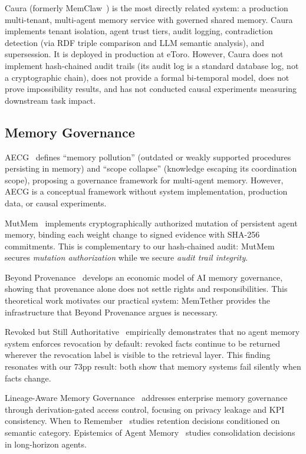 \documentclass[sigconf]{acmart}
\begin{document}
Caura (formerly MemClaw~\cite{caura}) is the most directly related system: a production multi-tenant, multi-agent memory service with governed shared memory. Caura implements tenant isolation, agent trust tiers, audit logging, contradiction detection (via RDF triple comparison and LLM semantic analysis), and supersession. It is deployed in production at eToro. However, Caura does not implement hash-chained audit trails (its audit log is a standard database log, not a cryptographic chain), does not provide a formal bi-temporal model, does not prove impossibility results, and has not conducted causal experiments measuring downstream task impact.

\subsection{Memory Governance}

AECG~\cite{aecg} defines ``memory pollution'' (outdated or weakly supported procedures persisting in memory) and ``scope collapse'' (knowledge escaping its coordination scope), proposing a governance framework for multi-agent memory. However, AECG is a conceptual framework without system implementation, production data, or causal experiments.

MutMem~\cite{mutmem} implements cryptographically authorized mutation of persistent agent memory, binding each weight change to signed evidence with SHA-256 commitments. This is complementary to our hash-chained audit: MutMem secures \emph{mutation authorization} while we secure \emph{audit trail integrity}.

Beyond Provenance~\cite{beyondprovenance} develops an economic model of AI memory governance, showing that provenance alone does not settle rights and responsibilities. This theoretical work motivates our practical system: MemTether provides the infrastructure that Beyond Provenance argues is necessary.

Revoked but Still Authoritative~\cite{revoked} empirically demonstrates that no agent memory system enforces revocation by default: revoked facts continue to be returned wherever the revocation label is visible to the retrieval layer. This finding resonates with our 73pp result: both show that memory systems fail silently when facts change.

Lineage-Aware Memory Governance~\cite{lineage} addresses enterprise memory governance through derivation-gated access control, focusing on privacy leakage and KPI consistency. When to Remember~\cite{whentoremember} studies retention decisions conditioned on semantic category. Epistemics of Agent Memory~\cite{epistemics} studies consolidation decisions in long-horizon agents.
\end{document}
